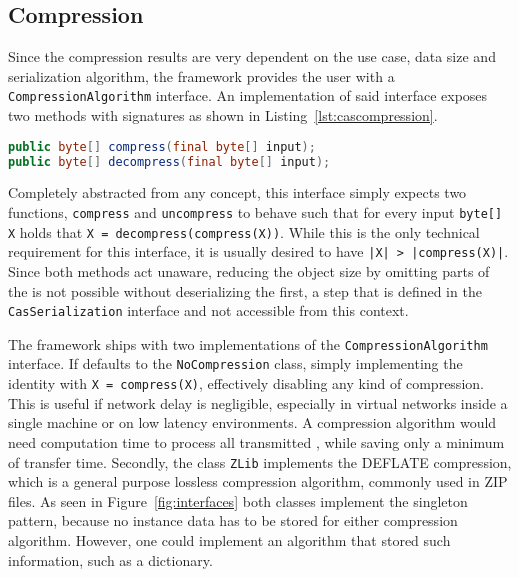 \subsection{Compression}
Since the compression results are very dependent on the use case, data size and serialization algorithm, the framework provides the user with a \lstinline|CompressionAlgorithm| interface. An implementation of said interface exposes two methods with signatures as shown in Listing~\ref{lst:cascompression}.
\begin{lstlisting}[language=Java,caption={CompressionAlgorithm method signatures},label=lst:cascompression]
public byte[] compress(final byte[] input);
public byte[] decompress(final byte[] input);
\end{lstlisting}
Completely abstracted from any \uima{} concept, this interface simply expects two functions, \lstinline|compress| and \lstinline|uncompress| to behave such that for every input \lstinline|byte[] X| holds that \lstinline|X = decompress(compress(X))|. While this is the only technical requirement for this interface, it is usually desired to have \lstinline+|X| > |compress(X)|+. Since both methods act \uima{} unaware, reducing the object size by omitting parts of the \cas{} is not possible without deserializing the \cas{} first, a step that is defined in the \lstinline|CasSerialization| interface and not accessible from this context. 

The framework ships with two implementations of the \lstinline|CompressionAlgorithm| interface. If defaults to the \lstinline|NoCompression| class, simply implementing the identity with \lstinline|X = compress(X)|, effectively disabling any kind of compression. This is useful if network delay is negligible, especially in virtual networks inside a single machine or on low latency environments. A compression algorithm would need computation time to process all transmitted \cas{}, while saving only a minimum of transfer time. Secondly, the class \lstinline|ZLib| implements the DEFLATE compression, which is a general purpose lossless compression algorithm, commonly used in ZIP files. As seen in Figure~\ref{fig:interfaces} both classes implement the singleton pattern, because no instance data has to be stored for either compression algorithm. However, one could implement an algorithm that stored such information, such as a dictionary.

